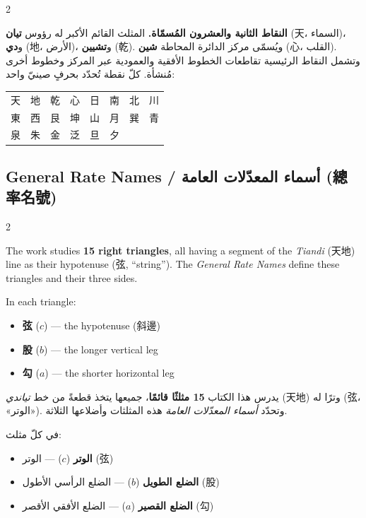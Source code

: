 \documentclass[11pt,a4paper]{article}
\newcommand{\ar}[1]{\arabicfont\beginR #1\endR}
\begin{document}
\begin{paracol}{2}
\switchcolumn

\ar{\textbf{النقاط الثانية والعشرون المُسمّاة.} المثلث القائم الأكبر له رؤوس \textbf{تيان} (天، السماء)، و\textbf{دي} (地، الأرض)، و\textbf{تشيين} (乾). ويُسمّى مركز الدائرة المحاطة \textbf{شين} (心، القلب). وتشمل النقاط الرئيسية تقاطعات الخطوط الأفقية والعمودية عبر المركز وخطوط أخرى مُنشأة. كلّ نقطة تُحدّد بحرفٍ صينيّ واحد:}

\begin{center}
\begin{tabular}{llllllll}
\toprule
天 & 地 & 乾 & 心 & 日 & 南 & 北 & 川 \\
東 & 西 & 艮 & 坤 & 山 & 月 & 巽 & 青 \\
泉 & 朱 & 金 & 泛 & 旦 & 夕 & & \\
\bottomrule
\end{tabular}
\end{center}

\end{paracol}

\subsection{General Rate Names / \ar{أسماء المعدّلات العامة} (總率名號)}
\label{subsec:names}

\begin{paracol}{2}

The work studies \textbf{15 right triangles}, all having a segment of the \textit{Tiandi} (天地) line as their hypotenuse (弦, ``string''). The \textit{General Rate Names} define these triangles and their three sides.

In each triangle:
\begin{itemize}[leftmargin=2em]
  \item \textbf{弦} ($c$) --- the hypotenuse (斜邊)
  \item \textbf{股} ($b$) --- the longer vertical leg
  \item \textbf{勾} ($a$) --- the shorter horizontal leg
\end{itemize}

\switchcolumn

\ar{يدرس هذا الكتاب \textbf{15 مثلثًا قائمًا}، جميعها يتخذ قطعةً من خط \textit{تياندي} (天地) وترًا له (弦، «الوتر»). وتحدّد \textit{أسماء المعدّلات العامة} هذه المثلثات وأضلاعها الثلاثة.}

\vspace{0.3cm}

\ar{في كلّ مثلث:}
\begin{itemize}[leftmargin=2em,rightmargin=0em]
  \item \ar{\textbf{الوتر} ($c$) — الوتر (弦)}
  \item \ar{\textbf{الضلع الطويل} ($b$) — الضلع الرأسي الأطول (股)}
  \item \ar{\textbf{الضلع القصير} ($a$) — الضلع الأفقي الأقصر (勾)}
\end{itemize}

\end{paracol}
\end{document}
